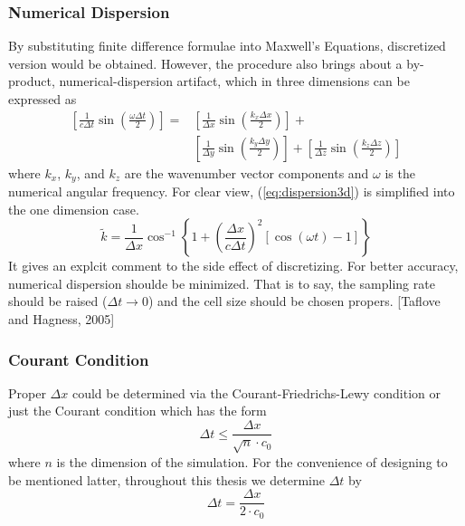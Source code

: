 \subsubsection{Numerical Dispersion}
By substituting finite difference formulae into Maxwell's Equations, discretized version would be obtained. However, the
procedure also brings about a by-product, numerical-dispersion artifact, which in three dimensions can be expressed as
\begin{equation}
  \label{eq:dispersion3d}
  \begin{split}
    \left[\frac{1}{c\Delta t}\sin\left(\frac{\omega\Delta t}{2}\right)\right] = &
    \left[\frac{1}{\Delta x}\sin\left(\frac{k_x\Delta x}{2}\right)\right] + \\ &
    \left[\frac{1}{\Delta y}\sin\left(\frac{k_y\Delta y}{2}\right)\right] +
    \left[\frac{1}{\Delta z}\sin\left(\frac{k_z\Delta z}{2}\right)\right]
  \end{split}
\end{equation}
where $k_x$, $k_y$, and $k_z$ are the wavenumber vector components and $\omega$ is the numerical angular frequency. For
clear view, (\ref{eq:dispersion3d}) is simplified into the one dimension case.
\begin{equation}
  \widetilde{k} = \frac{1}{\Delta x} \cos^{-1} \left\{1+\left(\frac{\Delta x}{c\Delta t}\right)^2\left[\cos(\omega t)-1\right]\right\}
\end{equation}
It gives an explcit comment to the side effect of discretizing. For better accuracy, numerical dispersion shoulde be
minimized. That is to say, the sampling rate should be raised ($\Delta t \rightarrow 0$) and the cell size should be
chosen propers. [Taflove and Hagness, 2005]


\subsubsection{Courant Condition}
Proper $\Delta x$ could be determined via the Courant-Friedrichs-Lewy condition or just the Courant condition which has
the form
\begin{equation}
  \Delta t \le \frac{\Delta x}{\sqrt{n}\cdot c_0}
\end{equation}
where $n$ is the dimension of the simulation. For the convenience of designing to be mentioned latter, throughout this
thesis we determine $\Delta t$ by
\begin{equation}
  \Delta t = \frac{\Delta x}{2 \cdot c_0}
\end{equation}

